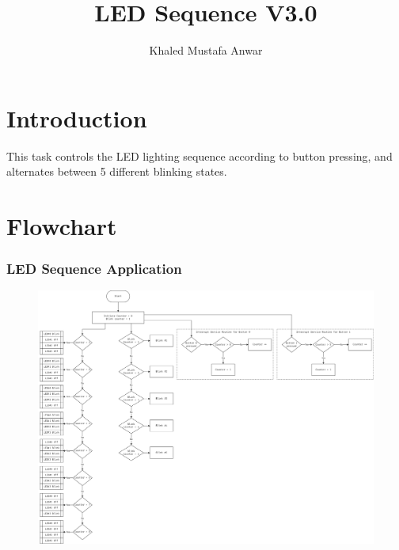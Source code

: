 \documentclass[10pt]{article}
\title{LED Sequence V3.0}
\author{Khaled Mustafa Anwar}
\begin{document}
\maketitle

\section{Introduction}
This task controls the LED lighting sequence according to button pressing, and alternates between 5 different blinking states.

\section{Flowchart}

\subsubsection{LED Sequence Application}
\begin{figure}[H]
	\includegraphics[width=14cm]{led-sequence_v_3_0}
	\centering
\end{figure}
\end{document}
